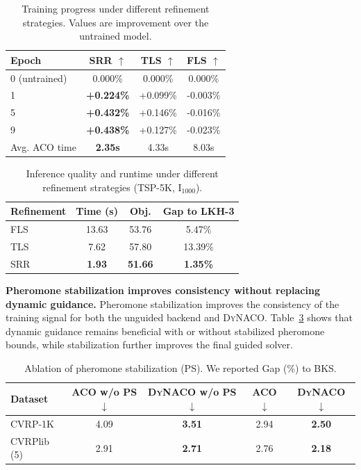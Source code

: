 \documentclass[sigconf]{acmart}
\newcommand{\DyNACO}{\textsc{DyNACO}}
\begin{document}
\begin{table}[t]
\centering
\caption{Training progress under different refinement strategies. Values are improvement over the untrained model.}
\label{tab:srr-training}
\small
\setlength{\tabcolsep}{0pt}
\renewcommand{\arraystretch}{0.80}
\begin{tabular*}{\columnwidth}{@{\extracolsep{\fill}}lccc@{}}
\toprule
Epoch & SRR $\uparrow$ & TLS $\uparrow$ & FLS $\uparrow$ \\
\midrule
0 (untrained) & 0.000\% & 0.000\% & 0.000\% \\
1 & \textbf{+0.224\%} & +0.099\% & -0.003\% \\
5 & \textbf{+0.432\%} & +0.146\% & -0.016\% \\
9 & \textbf{+0.438\%} & +0.127\% & -0.023\% \\
\midrule
Avg. ACO time & \textbf{2.35s} & 4.33s & 8.03s \\
\bottomrule
\end{tabular*}
\end{table}

\begin{table}[t]
\centering
\caption{Inference quality and runtime under different refinement strategies (TSP-5K, I$_{1000}$).}
\label{tab:srr-inference}
\small
\renewcommand{\arraystretch}{0.85}
\begin{tabular*}{\columnwidth}{@{\extracolsep{\fill}}lccc@{}}
\toprule
Refinement & Time (s) & Obj. & Gap to LKH-3 \\
\midrule
FLS & 13.63 & 53.76 & 5.47\% \\
TLS & 7.62 & 57.80 & 13.39\% \\
SRR & \textbf{1.93} & \textbf{51.66} & \textbf{1.35\%} \\
\bottomrule
\end{tabular*}
\end{table}

\smallskip\noindent\textbf{Pheromone stabilization improves consistency without replacing dynamic guidance.}
Pheromone stabilization improves the consistency of the training signal for both the unguided backend and \DyNACO{}.
Table~\ref{tab:ps-ablation} shows that dynamic guidance remains beneficial with or without stabilized pheromone bounds, while stabilization further improves the final guided solver.

\begin{table}[t]
\centering
\caption{Ablation of pheromone stabilization (PS). We reported Gap (\%) to BKS.}
\label{tab:ps-ablation}
\small
\renewcommand{\arraystretch}{0.85}
\begin{tabular*}{\columnwidth}{@{\extracolsep{\fill}}lcccc@{}}
\toprule
Dataset & ACO w/o PS $\downarrow$ & \DyNACO{} w/o PS $\downarrow$ & ACO $\downarrow$ & \DyNACO{} $\downarrow$ \\
\midrule
CVRP-1K & 4.09 & \textbf{3.51} & 2.94 & \textbf{2.50} \\
CVRPlib (5) & 2.91 & \textbf{2.71} & 2.76 & \textbf{2.18} \\
\bottomrule
\end{tabular*}
\end{table}
\end{document}

